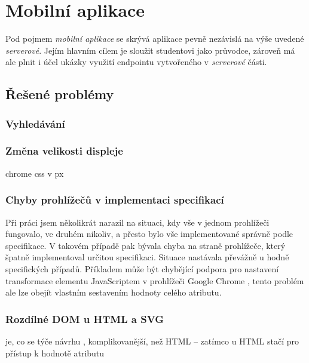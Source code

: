

\section{Mobilní aplikace}
Pod pojmem \textit{mobilní aplikace} se skrývá aplikace pevně nezávislá na výše uvedené \textit{serverové}. Jejím hlavním cílem je sloužit studentovi   jako průvodce, zároveň má ale plnit i účel ukázky využití  endpointu vytvořeného v \textit{serverové} části.


\subsection{Řešené problémy}

\subsubsection{Vyhledávání}

\subsubsection{Změna velikosti displeje}
chrome css v px

\subsubsection{Chyby prohlížečů v implementaci specifikací}
Při práci jsem několikrát narazil na situaci, kdy vše v jednom prohlížeči fungovalo, ve druhém nikoliv, a přesto bylo vše implementované správně podle specifikace. V takovém případě pak bývala chyba na straně prohlížeče, který špatně implementoval určitou specifikaci. Situace nastávala převážně u hodně specifických případů. Příkladem může být chybějící podpora pro nastavení transformace  elementu JavaScriptem v prohlížeči Google Chrome \cite{BugChromeTran}, tento problém ale lze obejít vlastním sestavením hodnoty celého atributu. 

\subsubsection{Rozdílné DOM u HTML a SVG}
 je, co se týče návrhu , komplikovanější, než HTML -- zatímco u HTML stačí pro přístup k hodnotě atributu 

